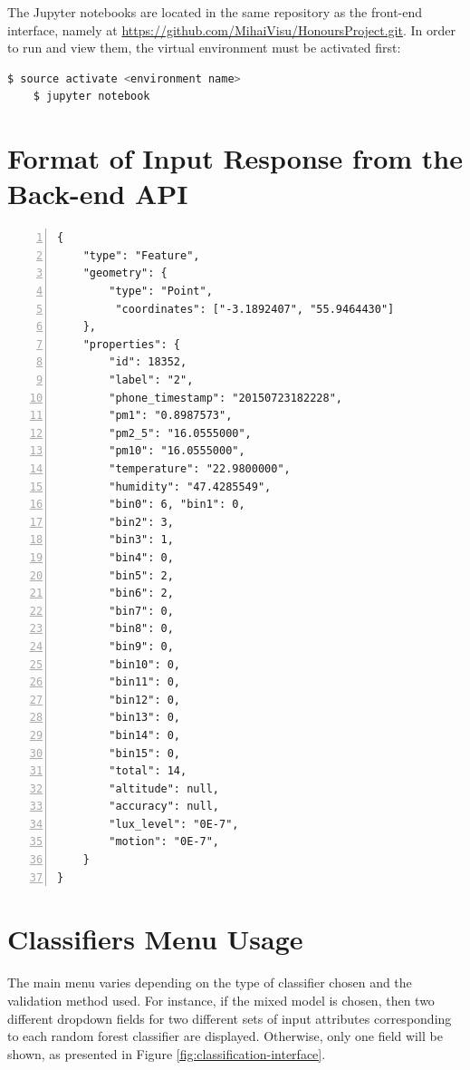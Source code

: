 \documentclass[bsc,frontabs,twoside,singlespacing, parskip,deptreport]{infthesis}     %
\begin{document}
\begin{appendices}
The Jupyter notebooks are located in the same repository as the front-end interface, namely at \url{https://github.com/MihaiVisu/HonoursProject.git}. In order to run and view them, the virtual environment must be activated first:

\begin{lstlisting}[language=bash, backgroundcolor=\color{lightgray!20}, basicstyle=\ttfamily\bfseries] 
	$ source activate <environment name>
	$ jupyter notebook
\end{lstlisting}


\section{Format of Input Response from the Back-end API}

\begin{lstlisting}[numbers=left, caption={This code listing represents an example of a data input in GeoJSON format, which is sent from the back-end to the front-end of the data visualization tool after performing urban environments clustering. The "label" key represents the id corresponding to either a certain urban environment or a specific mode of transport, depending on the type of request received by the API from the front-end interface.}]
{
	"type": "Feature", 
	"geometry": {
		"type": "Point",
		 "coordinates": ["-3.1892407", "55.9464430"]
	},
	"properties": {
		"id": 18352, 
		"label": "2", 
		"phone_timestamp": "20150723182228",
		"pm1": "0.8987573",
		"pm2_5": "16.0555000", 
		"pm10": "16.0555000",
		"temperature": "22.9800000", 
		"humidity": "47.4285549",
		"bin0": 6, "bin1": 0, 
		"bin2": 3, 
		"bin3": 1, 
		"bin4": 0, 
		"bin5": 2, 
		"bin6": 2, 
		"bin7": 0, 
		"bin8": 0, 
		"bin9": 0, 
		"bin10": 0, 
		"bin11": 0, 
		"bin12": 0, 
		"bin13": 0, 
		"bin14": 0, 
		"bin15": 0, 
		"total": 14, 
		"altitude": null, 
		"accuracy": null, 
		"lux_level": "0E-7", 
		"motion": "0E-7", 
	}
}
\end{lstlisting}



\section{Classifiers Menu Usage}
\label{sec:menu-usage}

The main menu varies depending on the type of classifier chosen and the validation method used. For instance, if the mixed model is chosen, then two different dropdown fields for two different sets of input attributes corresponding to each random forest classifier are displayed. Otherwise, only one field will be shown, as presented in Figure \ref{fig:classification-interface}.


\end{appendices}
\end{document}
